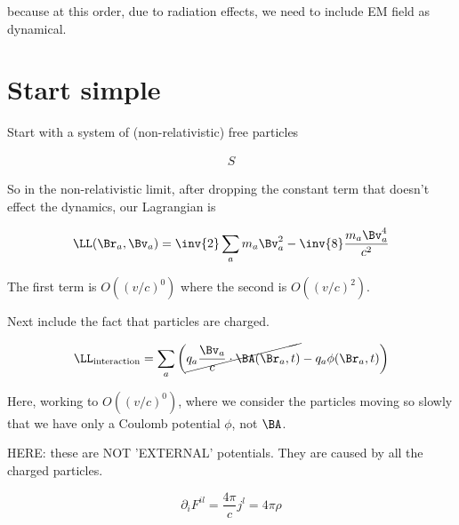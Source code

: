 because at this order, due to radiation effects, we need to include EM field as dynamical.

\section{Start simple}

Start with a system of (non-relativistic) free particles

\begin{align*}
S 
\end{align*}

So in the non-relativistic limit, after dropping the constant term that doesn't effect the dynamics, our Lagrangian is 

\begin{equation}\label{eqn:relativisticElectrodynamicsL24:90}
\LL(\Br_a, \Bv_a) = \inv{2} \sum_a m_a \Bv_a^2 - \inv{8} \frac{m_a \Bv_a^4}{c^2}
\end{equation}

The first term is $O((v/c)^0)$ where the second is $O((v/c)^2)$.

Next include the fact that particles are charged.

\begin{equation}\label{eqn:relativisticElectrodynamicsL24:110}
\LL_{\text{interaction}} = \sum_a \left( \cancel{q_a \frac{\Bv_a}{c} \cdot \BA(\Br_a, t)} - q_a \phi(\Br_a, t) \right)
\end{equation}

Here, working to $O((v/c)^0)$, where we consider the particles moving so slowly that we have only a Coulomb potential $\phi$, not $\BA$.

HERE: these are NOT 'EXTERNAL' potentials.  They are caused by all the charged particles.

\begin{equation}\label{eqn:relativisticElectrodynamicsL24:130}
\partial_i F^{i l} = \frac{4 \pi}{c} j^l = 4 \pi \rho
\end{equation}

